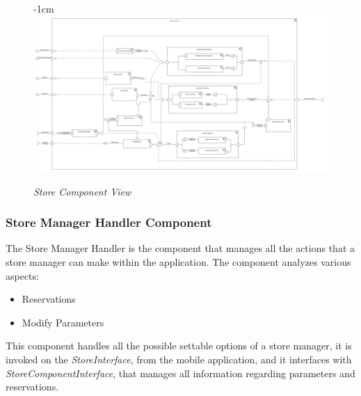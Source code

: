 \documentclass{article}
\begin{document}
			\begin{figure}[H]
				\begin{adjustwidth} {-1cm}{}
					\centering
					\includegraphics[scale=0.22, angle=90, trim= 0 0 0 -5cm]{Component Diagrams/ReorderedStoreComponentView.pdf}\\
				\end{adjustwidth}
				\caption{\emph{Store Component View}}
			\end{figure}
			\newpage
			
		\subsubsection{Store Manager Handler Component}
			The Store Manager Handler is the component that manages all the actions that a store manager can make within the application. The component analyzes various aspects:
			
			\begin{itemize}
				\item Reservations
				\item Modify Parameters
			\end{itemize}
		
			This component handles all the possible settable options of a store manager, it is invoked on the \emph{StoreInterface}, from the mobile application, and it interfaces with \emph{StoreComponentInterface}, that manages all information regarding parameters and reservations.
			
\end{document}
